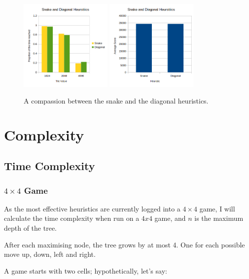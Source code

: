 \documentclass{article}
\begin{document}
\begin{figure}
    \centering
    \includegraphics[width=0.4\textwidth]{SnakeToDiagonal.png}
    \includegraphics[width=0.4\textwidth]{SnakeToDiagonalScore.png}
    \caption{A compassion between the snake and the diagonal heuristics.}
    \label{fig:SnakeVDiagonal}
\end{figure}


\section{Complexity}
\label{sec:complexity}
\subsection{Time Complexity}
\label{subsec:time_comp}
\subsubsection{$4\times4$ Game}
As the most effective heuristics are currently logged into a $4\times4$ game, I will calculate the time complexity when run on a $4x4$ game, and $n$ is the maximum depth of the tree.

After each maximising node, the tree grows by at most 4. One for each possible move up, down, left and right.

A game starts with two cells; hypothetically, let's say:
\end{document}
